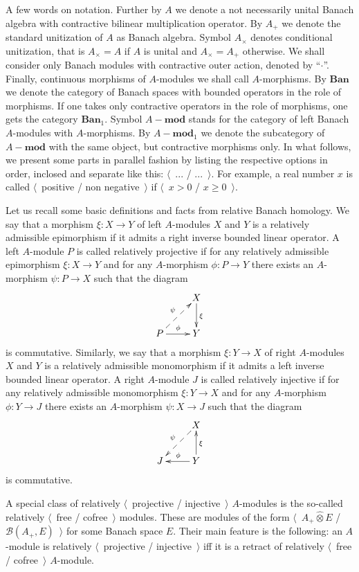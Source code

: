 \documentclass[12pt]{article}
\newcommand{\projtens}{\mathbin{\widehat{\otimes}}}
\begin{document}
A few words on notation. Further by $A$ we denote a not necessarily unital Banach algebra with contractive bilinear multiplication operator. By $A_+$ we denote the standard unitization of $A$ as Banach algebra. Symbol $A_\times$ denotes conditional unitization, that is $A_\times=A$ if $A$ is unital and $A_\times=A_+$ otherwise. We shall consider only Banach modules with contractive outer action, denoted by ``$\cdot$''. Finally, continuous morphisms of $A$-modules we shall call $A$-morphisms. By $\mathbf{Ban}$ we denote the category of Banach spaces with bounded operators in the role of morphisms. If one takes only contractive operators in the role of morphisms, one gets the category $\mathbf{Ban}_1$. Symbol $A-\mathbf{mod}$ stands for the category of left Banach $A$-modules with $A$-morphisms. By $A-\mathbf{mod}_1$ we denote the subcategory of $A-\mathbf{mod}$ with the same object, but contractive morphisms only. In what follows, we present some parts in parallel fashion by listing the respective options in order, inclosed and separate like this: $\langle$~... / ...~$\rangle$. For example, a real number $x$ is called $\langle$~positive / non negative~$\rangle$ if $\langle$~$x>0$ / $x\geq 0$~$\rangle$.

Let us recall some basic definitions and facts from relative Banach homology. We say that a morphism $\xi:X\to Y$ of left $A$-modules $X$ and $Y$ is a relatively admissible epimorphism if it admits a right inverse bounded linear operator. A left $A$-module $P$ is called relatively projective if for any relatively admissible  epimorphism $\xi:X\to Y$ and for any $A$-morphism $\phi:P\to Y$ there exists an $A$-morphism $\psi:P\to X$ such that the diagram
$$
\xymatrix{
& {X} \ar[d]^{\xi}\\
{P} \ar@{-->}[ur]^{\psi} \ar[r]^{\phi} &{Y}}
$$
is commutative. Similarly,  we say that a morphism $\xi:Y\to X$ of right $A$-modules $X$ and $Y$ is a relatively admissible monomorphism if it admits a left inverse bounded linear operator. A right $A$-module $J$ is called relatively injective if for any relatively admissible  monomorphism $\xi:Y\to X$ and for any $A$-morphism $\phi:Y\to J$ there exists an $A$-morphism $\psi:X\to J$ such that the diagram
$$
\xymatrix{
& {X} \ar@{-->}[dl]_{\psi} \\
{J} &{Y} \ar[l]_{\phi} \ar[u]_{\xi}}
$$
is commutative. 

A special class of relatively $\langle$~projective / injective~$\rangle$ $A$-modules is the so-called relatively $\langle$~free / cofree~$\rangle$ modules. These are modules of the form $\langle$~$A_+\projtens E$ / $\mathcal{B}(A_+,E)$~$\rangle$ for some Banach space $E$. Their main feature is the following: an $A$-module is relatively $\langle$~projective / injective~$\rangle$ iff it is a retract of relatively $\langle$~free / cofree~$\rangle$ $A$-module. 
\end{document}
